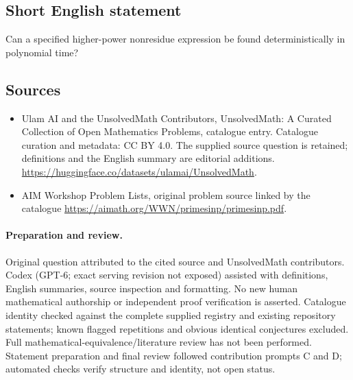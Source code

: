 \documentclass[11pt]{article}
\begin{document}
\subsection{Short English statement}
Can a specified higher-power nonresidue expression be found deterministically in polynomial time?
\subsection{Sources}
\begin{itemize}
\item[\hypertarget{source:statement:1}{S1}] Ulam AI and the UnsolvedMath Contributors, UnsolvedMath: A Curated Collection of Open Mathematics Problems, catalogue entry. Catalogue curation and metadata: CC BY 4.0. The supplied source question is retained; definitions and the English summary are editorial additions.
\url{https://huggingface.co/datasets/ulamai/UnsolvedMath}.
\item[\hypertarget{source:statement:2}{S2}] AIM Workshop Problem Lists, original problem source linked by the catalogue
\url{https://aimath.org/WWN/primesinp/primesinp.pdf}.
\end{itemize}
\paragraph{Preparation and review.}
Original question attributed to the cited source and UnsolvedMath contributors. Codex (GPT-6; exact serving revision not exposed) assisted with definitions, English summaries, source inspection and formatting. No new human mathematical authorship or independent proof verification is asserted. Catalogue identity checked against the complete supplied registry and existing repository statements; known flagged repetitions and obvious identical conjectures excluded. Full mathematical-equivalence/literature review has not been performed. Statement preparation and final review followed contribution prompts C and D; automated checks verify structure and identity, not open status.
\label{end:statement}
\end{document}
